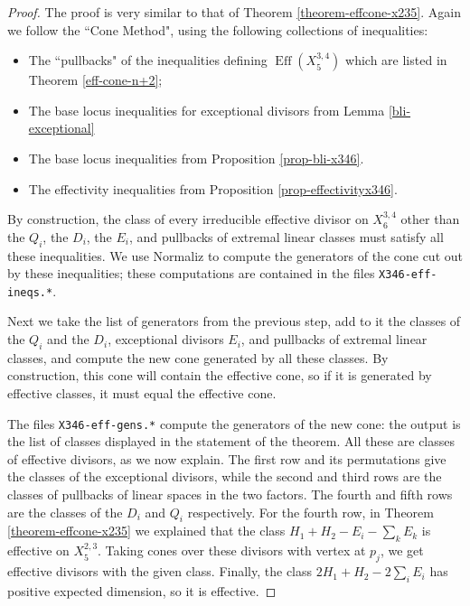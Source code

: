 \documentclass[a4paper,11pt]{article}
\newcommand{\Eff}{\operatorname{Eff}}
\begin{document}
\begin{proof}
    The proof is very similar to that of Theorem \ref{theorem-effcone-x235}. Again we follow the ``Cone Method",
 using the following collections of inequalities:
\begin{itemize}
    \item The ``pullbacks" of the inequalities defining $\Eff(X^{3,4}_5)$ which are listed in Theorem \ref{eff-cone-n+2};
    \item The base locus inequalities for exceptional divisors from Lemma \ref{bli-exceptional}
    \item The base locus inequalities from Proposition \ref{prop-bli-x346}.  
    \item The effectivity inequalities from Proposition \ref{prop-effectivityx346}.
  
\end{itemize}
By construction, the class of every irreducible effective divisor on $X^{3,4}_6$ other than the $Q_i$, the $D_i$, the $E_i$, and pullbacks of extremal linear classes must satisfy all these inequalities. We use Normaliz to compute the generators of the cone cut out by these inequalities; these computations are contained in the files {\tt X346-eff-ineqs.*}.

Next we take the list of generators from the previous step, add to it the classes of the $Q_i$ and the $D_i$, exceptional divisors $E_i$, and pullbacks of extremal linear classes, and compute the new cone generated by all these classes. By construction, this cone will contain the effective cone, so if it is generated by effective classes, it must equal the effective cone. 

The files {\tt X346-eff-gens.*} compute the generators of the new cone: the output is the list of classes displayed in the statement of the theorem. All these are classes of effective divisors, as we now explain. The first row and its permutations give the classes of the exceptional divisors, while the second and third rows are the classes of pullbacks of linear spaces in the two factors. The fourth and fifth rows are the classes of the $D_i$ and $Q_i$ respectively. For the fourth row, in Theorem \ref{theorem-effcone-x235} we explained that the class $H_1+H_2-E_i-\sum_k E_k$ is effective on $X^{2,3}_5$. Taking cones over these divisors with vertex at $p_j$, we get effective divisors with the given class. Finally, the class $2H_1+H_2-2\sum_i E_i$ has positive expected dimension, so it is effective.
\end{proof}
\end{document}
